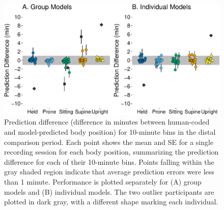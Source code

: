 \documentclass[
  man]{apa6}
\begin{document}
\begin{figure}

{\centering \includegraphics{manuscript_files/figure-latex/part2bins-1} 

}

\caption{Prediction difference (difference in minutes between human-coded and model-predicted body position) for 10-minute bins in the distal comparison period. Each point shows the mean and SE for a single recording session for each body position, summarizing the prediction difference for each of their 10-minute bins. Points falling within the gray shaded region indicate that average prediction errors were less than 1 minute. Performance is plotted separately for (A) group models and (B) individual models. The two outlier participants are plotted in dark gray, with a different shape marking each individual.}\label{fig:part2bins}
\end{figure}
\end{document}
